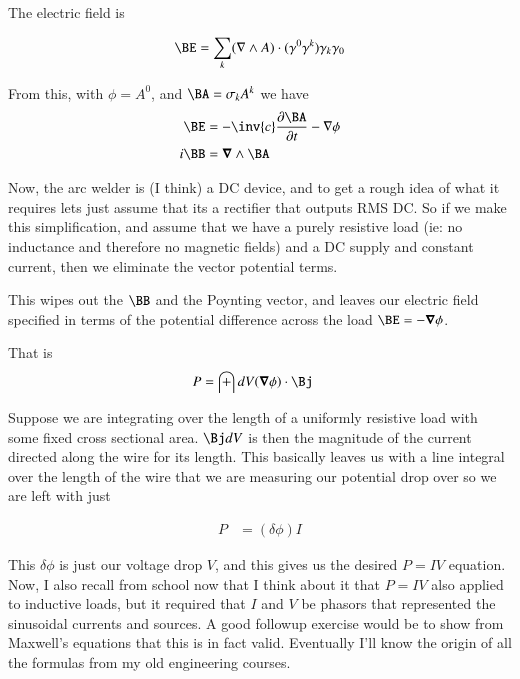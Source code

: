 The electric field is

\begin{align*}
\BE &= \sum_k (\grad \wedge A) \cdot (\gamma^0 \gamma^k) \gamma_k \gamma_0 \\
\end{align*}

From this, with $\phi = A^0$, and $\BA = \sigma_k A^k$ we have
\begin{align*}
\BE &= -\inv{c} \PD{t}{\BA} - \grad \phi \\
i\BB &= \spacegrad \wedge \BA
\end{align*}

Now, the arc welder is (I think) a DC device, and to 
get a rough idea of what it requires lets just assume that its a rectifier that outputs RMS DC.
So if we make this simplification, and assume that we have a 
purely resistive load (ie: no inductance and therefore no magnetic fields) and a DC supply and constant current, then
we eliminate the vector potential terms.

This wipes out the $\BB$ and the Poynting vector, and leaves our electric field specified in terms
of the potential difference across the load $\BE = -\spacegrad \phi$.

That is
\begin{align*}
P &= \int dV (\spacegrad \phi) \cdot \Bj
\end{align*}

Suppose we are integrating over the length of a uniformly resistive load with some fixed cross sectional area.  $\Bj dV$ is then the magnitude of the current directed along the wire for its length.  This basically leaves us with a line integral over the length of the wire that we are measuring our potential drop over so we are left with just

\begin{align*}
P &= (\delta \phi) I
\end{align*}

This $\delta \phi$ is just our voltage drop $V$, and this gives us the desired $P = I V$ equation.
Now, I also recall from school
now that I think about it that $P = I V$ also applied to inductive loads, but it required that $I$ and $V$ be phasors that
represented the sinusoidal currents and sources.  A good followup exercise would be to show from Maxwell's equations
that this is in fact valid.  Eventually I'll know the origin of all the formulas from my old engineering courses.
